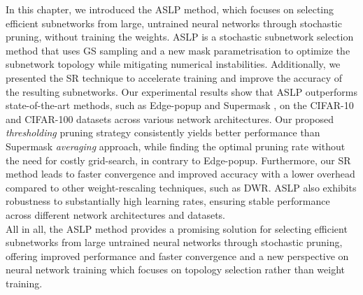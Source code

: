 In this chapter, we introduced the \acl{ASLP} method, which focuses on selecting
efficient subnetworks from large, untrained neural networks through stochastic
pruning, without training the weights. \acl{ASLP} is a stochastic subnetwork
selection method that uses \acl{GS} sampling and a new mask parametrisation to
optimize the subnetwork topology while mitigating numerical instabilities.
Additionally, we presented the \acl{SR} technique to accelerate training and
improve the accuracy of the resulting subnetworks. Our experimental results show
that \ac{ASLP} outperforms state-of-the-art methods, such as Edge-popup
\cite{DBLP:conf/cvpr/RamanujanWKFR20} and Supermask
\cite{DBLP:conf/nips/ZhouLLY19}, on the CIFAR-10 and CIFAR-100 datasets across
various network architectures. Our proposed \textit{thresholding} pruning
strategy consistently yields better performance than Supermask
\textit{averaging} approach, while finding the optimal pruning rate without the
need for costly grid-search, in contrary to Edge-popup. Furthermore, our
\acl{SR} method leads to faster convergence and improved accuracy with a lower
overhead compared to other weight-rescaling techniques, such as \acl{DWR}.
\acl{ASLP} also exhibits robustness to substantially high learning rates,
ensuring stable performance across different network architectures and
datasets.\\

All in all, the \acl{ASLP} method provides a promising solution for selecting
efficient subnetworks from large untrained neural networks through stochastic
pruning, offering improved performance and faster convergence and a new
perspective on neural network training which focuses on topology selection
rather than weight training.



